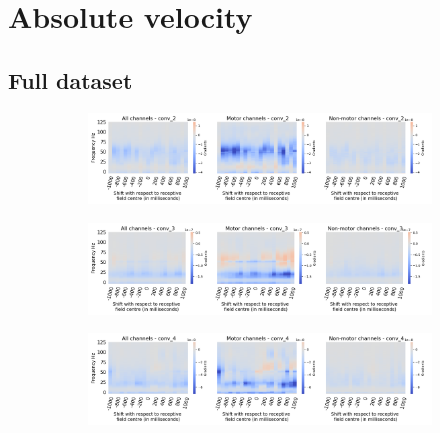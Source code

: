 \section*{Absolute velocity}\label{sec:absolute-velocity-appendixC}

\subsection*{Full dataset}\label{subsec:absVel-full-dataset-appendixC}
\begin{figure}[!htpb]
\centering
\begin{subfigure}[b]{\textwidth}
   \includegraphics[width=1\linewidth]{img/appendix/C/m/absVel/sbp0_m_shift_gradients_conv_2_all_kinds}
   \caption{}
   \label{fig:absVel-shifting-grads-conv-2}
\end{subfigure}

\begin{subfigure}[b]{\textwidth}
   \includegraphics[width=1\linewidth]{img/appendix/C/m/absVel/sbp0_m_shift_gradients_conv_3_all_kinds}
   \caption{}
   \label{fig:absVel-shifting-grads-conv-3}
\end{subfigure}

\begin{subfigure}[b]{\textwidth}
   \includegraphics[width=1\linewidth]{img/appendix/C/m/absVel/sbp0_m_shift_gradients_conv_4_all_kinds}
   \caption{}
   \label{fig:absVel-shifting-grads-conv-4}
\end{subfigure}


\end{figure}
